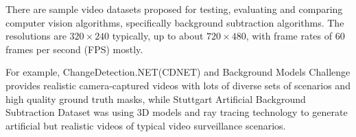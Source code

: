 There are sample video datasets proposed for testing, evaluating and comparing computer vision algorithms, specifically background subtraction algorithms. The resolutions are $320 \times 240$ typically, up to about $720 \times 480$, with frame rates of $60$ frames per second (FPS) mostly.

For example, ChangeDetection.NET(CDNET) \cite{goyette2012changedetection} and Background Models Challenge \cite{vacavant2012benchmark} provides realistic camera-captured videos with lots of diverse sets of scenarios and high quality ground truth masks, while Stuttgart Artificial Background Subtraction Dataset \cite{brutzer2011evaluation} was using 3D models and ray tracing technology to generate artificial but realistic videos of typical video surveillance scenarios.
